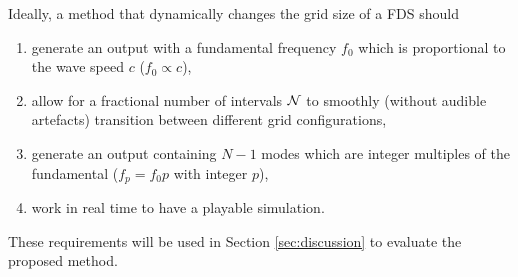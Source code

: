 
Ideally, a method that dynamically changes the grid size of a FDS should
\begin{enumerate}[label={r\arabic*.}]
    \item generate an output with a fundamental frequency $f_0$ %
    which is proportional to the wave speed $c$ ($f_0 \propto c$),
    \item allow for a fractional number of intervals $\mathcal{N}$ to smoothly (without audible artefacts) transition between different grid configurations,%
    \item generate an output containing $ N-1$ modes which are integer multiples of the fundamental ($f_p = f_0 p$ with integer $p$),
    \item work in real time to have a playable simulation.
\end{enumerate}
These requirements will be used in Section \ref{sec:discussion} to evaluate the proposed method.
%

